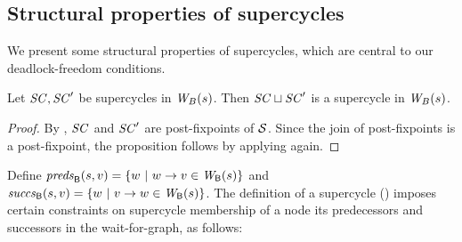






\subsection{Structural properties of supercycles}
\label{secn:supercycle-structural}


We present some structural properties of supercycles, which
are central to our deadlock-freedom conditions.


\begin{proposition} \label{prop:supercycle:union}
Let $\mathit{SC}, \mathit{SC}'$ be supercycles in $\mathit{W}_{B}({s})$. Then $\mathit{SC} \sqcup \mathit{SC}'$ is
a supercycle in $\mathit{W}_{B}({s})$.
\end{proposition}
%
\begin{proof}
By , $\mathit{SC}$ and $\mathit{SC}'$ are post-fixpoints of $\mathcal{S}$. Since the join of post-fixpoints is a post-fixpoint, 
the proposition follows by applying  again.
\end{proof}





Define
$\mathit{preds}_{\mathsf{B}}({s, v}) = \{ w ~|~ w \rightarrow v \in \mathit{W}_{\mathsf{B}}({s}) \}$ and 
$\mathit{succs}_{\mathsf{B}}({s, v}) = \{ w ~|~ v \rightarrow w \in \mathit{W}_{\mathsf{B}}({s}) \}$.
The definition of a supercycle () 
imposes certain constraints on supercycle membership of a node \wrt its predecessors and successors
in the wait-for-graph, as follows:

